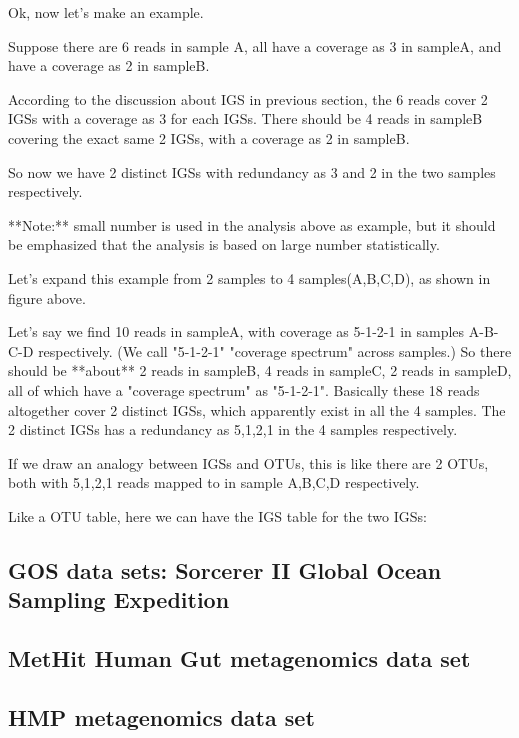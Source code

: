 Ok, now let's make an example. 

Suppose there are 6 reads in sample A, all have a coverage as 3 in sampleA, and have a coverage as 2 in sampleB.

According to the discussion about IGS in previous section, the 6 reads cover 2 IGSs with a coverage as 3 for each IGSs. There should be 4 reads in sampleB covering the exact same 2 IGSs, with a coverage as 2 in sampleB.

So now we have 2 distinct IGSs with redundancy as 3 and 2 in the two samples respectively. 

**Note:** small number is used in the analysis above as example, but it should be emphasized that the analysis is based on large number statistically.


Let's expand this example from 2 samples to 4 samples(A,B,C,D), as shown in figure above.

Let's say we find 10 reads in sampleA, with coverage as 5-1-2-1 in samples A-B-C-D respectively. (We call "5-1-2-1" "coverage  spectrum" across samples.) So there should be **about** 2 reads in sampleB, 4 reads in sampleC, 2 reads in sampleD, all of which have a "coverage spectrum" as "5-1-2-1". Basically these 18 reads altogether cover 2 distinct IGSs, which apparently exist in all the 4 samples. The 2 distinct IGSs has a redundancy as 5,1,2,1 in the 4 samples respectively.

If we draw an analogy between IGSs and OTUs, this is like there are 2 OTUs, both with 5,1,2,1 reads mapped to in sample A,B,C,D respectively.

Like a OTU table, here we can have the IGS table for the two IGSs:
%
%    
    
    
    
    
\subsection{GOS data sets: Sorcerer II Global Ocean Sampling Expedition}

\subsection{MetHit Human Gut metagenomics data set}

\subsection{HMP metagenomics data set}

